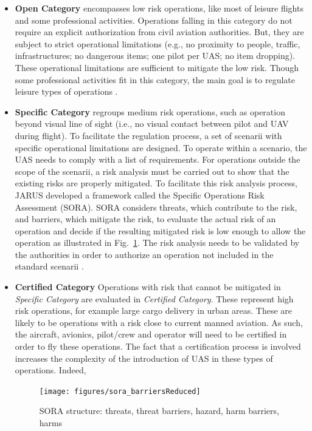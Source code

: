 \begin{itemize}
\item{\textbf{Open Category} encompasses low risk operations, like most of leisure flights and some professional activities. 
Operations falling in this category do not require an explicit authorization from civil aviation authorities. 
But, they are subject to strict operational limitations (e.g., no proximity to people, traffic, infrastructures; no dangerous items; one pilot per UAS; no item dropping). 
These operational limitations are sufficient to mitigate the low risk. 
Though some professional activities fit in this category, the main goal is to regulate leisure types of operations \cite{manfredi2018unmanned}.}
\item{\textbf{Specific Category} regroups medium risk operations, such as operation beyond visual line of sight (i.e., no visual contact between pilot and UAV during flight). 
To facilitate the regulation process, a set of scenarii with specific operational limitations are designed. 
To operate within a scenario, the UAS needs to comply with a list of requirements.
For operations outside the scope of the scenarii, a risk analysis must be carried out to show that the existing risks are properly mitigated. 
To facilitate this risk analysis process, JARUS developed a framework called the Specific Operations Risk Assessment (SORA). 
SORA considers threats, which contribute to the risk, and barriers, which mitigate the risk, to evaluate the actual risk of an operation and decide if the resulting mitigated risk is low enough to allow the operation as illustrated in Fig.~\ref{fig:sora_barriersReduced}.
The risk analysis needs to be validated by the authorities in order to authorize an operation not included in the standard scenarii \cite{manfredi2018unmanned}.}
\item{\textbf{Certified Category}  Operations with risk that cannot be mitigated in \emph{Specific Category} are evaluated in \emph{Certified Category}. 
These represent high risk operations, for example large cargo delivery in urban areas. 
These are likely to be operations with a risk close to current manned aviation. 
As such, the aircraft, avionics, pilot/crew and operator will need to be certified in order to fly these operations. 
The fact that a certification process is involved increases the complexity of the introduction of UAS in these types of operations. 
Indeed,  
\begin{landscape}
\begin{figure}
\begin{center}
\texttt{[image: figures/sora\_barriersReduced]}    %
\caption{SORA structure: threats, threat barriers, hazard, harm barriers, harms} 
\label{fig:sora_barriersReduced}
\end{center}
\end{figure}
\end{landscape}

}
\end{itemize}
